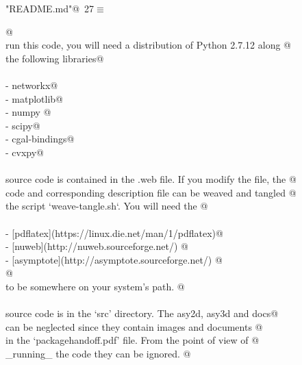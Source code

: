 \documentclass[10pt, english, oneside]{report}
\begin{document}
\begin{appendices}
\begin{flushleft} \small\label{scrap30}\raggedright\small
{} \verb@"README.md"@\nobreak\ {\footnotesize {27}}$\equiv$
\vspace{-1ex}
\begin{list}{}{} \item
\mbox{}\verb@    @\\
\mbox{}\verb@To run this code, you will need a distribution of Python 2.7.12 along @\\
\mbox{}\verb@with the following libraries@\\
\mbox{}\verb@@\\
\mbox{}\verb@- networkx@\\
\mbox{}\verb@- matplotlib@\\
\mbox{}\verb@- numpy @\\
\mbox{}\verb@- scipy@\\
\mbox{}\verb@- cgal-bindings@\\
\mbox{}\verb@- cvxpy@\\
\mbox{}\verb@@\\
\mbox{}\verb@All source code is contained in the .web file. If you modify the file, the @\\
\mbox{}\verb@resulting code and corresponding description file can be weaved and tangled @\\
\mbox{}\verb@with the script `weave-tangle.sh`. You will need the @\\
\mbox{}\verb@@\\
\mbox{}\verb@- [pdflatex](https://linux.die.net/man/1/pdflatex)@\\
\mbox{}\verb@- [nuweb](http://nuweb.sourceforge.net/) @\\
\mbox{}\verb@- [asymptote](http://asymptote.sourceforge.net/) @\\
\mbox{}\verb@  @\\
\mbox{}\verb@executables to be somewhere on your system's path. @\\
\mbox{}\verb@@\\
\mbox{}\verb@All source code is in the `src' directory. The asy2d, asy3d and docs@\\
\mbox{}\verb@folders can be neglected since they contain images and documents @\\
\mbox{}\verb@referenced in the `packagehandoff.pdf' file. From the point of view of @\\
\mbox{}\verb@_running_ the code they can be ignored. @\\
\mbox{}\verb@@\\
\mbox{}\verb@@\\
\mbox{}\verb@@\\
\mbox{}\verb@@{\NWsep}
\end{list}
\vspace{-1.5ex}
\footnotesize
\begin{list}{}{\setlength{\itemsep}{-\parsep}\setlength{\itemindent}{-\leftmargin}}


\end{list}
\end{flushleft}
\end{appendices}
\end{document}
